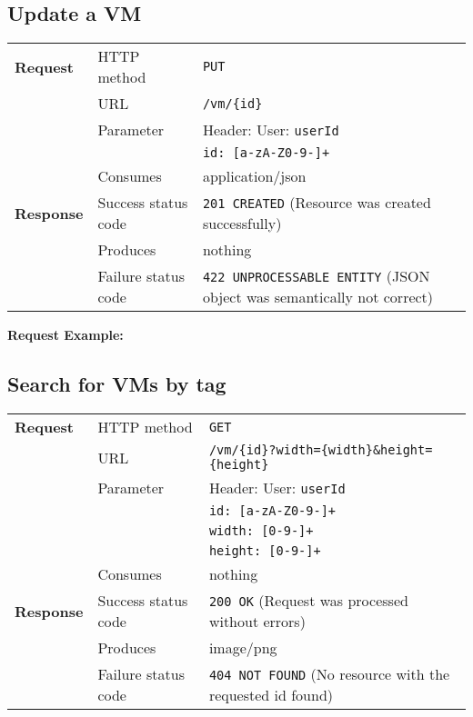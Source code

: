 \subsection{Update a VM} %

\begin{center}
	\begin{tabularx}{\textwidth}{llX} 
	    \toprule
					\textbf{Request}        &   HTTP method             &   \texttt{PUT}			\tabularnewline
		                        			&   URL                     &   \texttt{/vm/\{id\}}           	\tabularnewline
									& Parameter & Header: User: \texttt{userId} \tabularnewline
													& & \texttt{id: [a-zA-Z0-9-]+} \tabularnewline
                                  &   Consumes                &   application/json					      	\tabularnewline \midrule                       
          \textbf{Response}       &   Success status code     &   \texttt{201 CREATED} (Resource was created successfully) 	\tabularnewline
                                  &   Produces                &   nothing								\tabularnewline
                                  &   Failure status code     &   \texttt{422 UNPROCESSABLE ENTITY} (JSON object was semantically not correct)	\tabularnewline
           \bottomrule
	\end{tabularx}
\end{center}
\pagebreak[3] 	
		\textbf{Request Example:}
		
\pagebreak[3]


\subsection{Search for VMs by tag} %

\begin{center}
	\begin{tabularx}{\textwidth}{llX} 
	    \toprule
					\textbf{Request}        &   HTTP method             &   \texttt{GET}			\tabularnewline
		                        			&   URL                     &   \texttt{/vm/\{id\}?width=\{width\}\&height=\{height\}}           	\tabularnewline
									& Parameter & Header: User: \texttt{userId} \tabularnewline
													& & \texttt{id: [a-zA-Z0-9-]+} \tabularnewline
													& & \texttt{width: [0-9-]+} \tabularnewline
													& & \texttt{height: [0-9-]+} \tabularnewline
                                  &   Consumes                &   nothing					      	\tabularnewline \midrule                       
          \textbf{Response}       &   Success status code     &   \texttt{200 OK} (Request was processed without errors) 	\tabularnewline
                                  &   Produces                &   image/png								\tabularnewline
                                  &   Failure status code     &   \texttt{404 NOT FOUND} (No resource with the requested id found)	\tabularnewline
           \bottomrule
	\end{tabularx}
\end{center}
\pagebreak[3] 	
\pagebreak[3]


